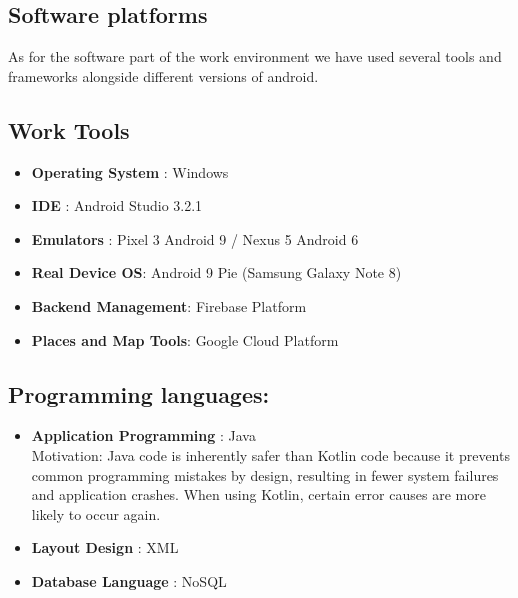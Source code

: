 \subsection{Software platforms}
As for the software part of the work environment we have used several tools 
and frameworks alongside different versions of android.

\subsection{Work Tools}
\begin{itemize}
\item \textbf{Operating System }: Windows 
\item \textbf{IDE }: Android Studio 3.2.1
\item \textbf{Emulators }: Pixel 3 Android 9 / Nexus 5 Android 6
\item \textbf{Real Device OS}: Android 9 Pie (Samsung Galaxy Note 8)
\item \textbf{Backend Management}: Firebase Platform
\item \textbf{Places and Map Tools}: Google Cloud Platform
\end{itemize}
 

\subsection{Programming languages:} 
\begin{itemize}
\item \textbf{Application Programming }: Java\\
Motivation: Java code is inherently safer than Kotlin code because it 
prevents common programming mistakes by design, resulting in fewer 
system failures and application crashes. When using Kotlin, certain error 
causes are more likely to occur again.
\item \textbf{Layout Design }: XML
\item \textbf{Database Language }: NoSQL
\end{itemize}

